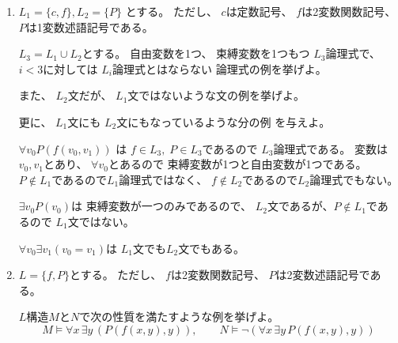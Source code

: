 \documentclass[12pt,b5paper]{ltjsarticle}
\begin{document}
\begin{enumerate}
       \begin{enumerate}
        \item
             $L_{1}=\{c,f\}, L_{2}=\{P\}$
             とする。
             ただし、
             $c$は定数記号、
             $f$は2変数関数記号、
             $P$は1変数述語記号である。
             
             $L_{3}=L_{1}\cup L_{2}$とする。
             自由変数を1つ、
             束縛変数を1つもつ
             $L_{3}$論理式で、
             $i< 3$に対しては
             $L_{i}$論理式とはならない
             論理式の例を挙げよ。

             また、
             $L_{2}$文だが、
             $L_{1}$文ではないような文の例を挙げよ。

             更に、
             $L_{1}$文にも
             $L_{2}$文にもなっているような分の例
             を与えよ。

             \dotfill


             $\forall v_{0}P( f(v_{0},v_{1}) )$
             は
             $f\in L_{3}, \; P\in L_{3}$であるので
             $L_{3}$論理式である。
             変数は$v_{0},v_{1}$とあり、
             $\forall v_{0}$とあるので
             束縛変数が1つと自由変数が1つである。
             $P \not\in L_{1}$であるので$L_{1}$論理式ではなく、
             $f\not\in L_{2}$であるので$L_{2}$論理式でもない。

             $\exists v_{0}P(v_{0})$は
             束縛変数が一つのみであるので、
             $L_{2}$文であるが、$P \not\in L_{1}$であるので
             $L_{1}$文ではない。

             $\forall v_{0} \exists v_{1} (v_{0} = v_{1})$は
             $L_{1}$文でも$L_{2}$文でもある。


             \hrulefill

        \item
             $L=\{f,P\}$とする。
             ただし、
             $f$は2変数関数記号、
             $P$は2変数述語記号である。

             $L$構造$M$と$N$で次の性質を満たすような例を挙げよ。
             \begin{equation}
              M \vDash \forall x \, \exists y \, \left(
                P\left( f\left(x,y\right), y \right)
              \right)
              , \qquad
              N \vDash \neg \left(
                \forall x \, \exists y \, P\left( f\left(x,y\right), y \right)
              \right)
             \end{equation}


\end{enumerate}
\end{enumerate}
\end{document}
